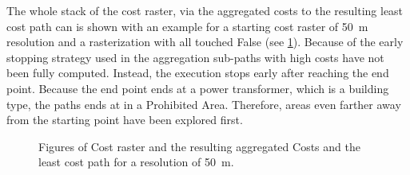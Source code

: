 The whole stack of the cost raster, via the aggregated costs to the resulting least cost path can is shown with an example for a starting cost raster of 50~m resolution and a rasterization with all touched False (see \ref{fig:costs2path}).
Because of the early stopping strategy used in the aggregation sub-paths with high costs have not been fully computed.
Instead, the execution stops early after reaching the end point.
Because the end point ends at a power transformer, which is a building type, the paths ends at in a Prohibited Area.
Therefore, areas even farther away from the starting point have been explored first.

\begin{figure}
	\centering
	
	\qquad
	\qquad

	\caption{Figures of Cost raster and the resulting aggregated Costs and the least cost path for a resolution of 50~m.}
	\label{fig:costs2path}
\end{figure}